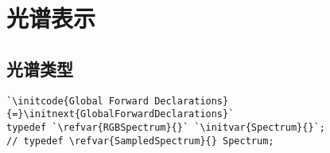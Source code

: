 \section{光谱表示}\label{sec:光谱表示}

\subsection{光谱类型}\label{sub:光谱类型}
\begin{lstlisting}
`\initcode{Global Forward Declarations}{=}\initnext{GlobalForwardDeclarations}`
typedef `\refvar{RGBSpectrum}{}` `\initvar{Spectrum}{}`;
// typedef \refvar{SampledSpectrum}{} Spectrum;
\end{lstlisting}